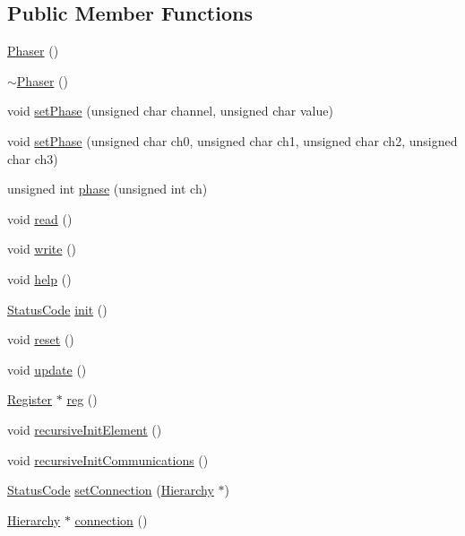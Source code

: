 \subsection*{Public Member Functions}
\begin{DoxyCompactItemize}
\item 
\hyperlink{classPhaser_a849a7f7cd7d1491c490e4ba8e9906af0}{Phaser} ()
\item 
\hyperlink{classPhaser_a1facd3a2776130beb38792025fd8be20}{$\sim$Phaser} ()
\item 
void \hyperlink{classPhaser_a35c0add55885b3c0a7551ff48e322632}{setPhase} (unsigned char channel, unsigned char value)
\item 
void \hyperlink{classPhaser_a658be408ea31d55067e283723fa144f1}{setPhase} (unsigned char ch0, unsigned char ch1, unsigned char ch2, unsigned char ch3)
\item 
unsigned int \hyperlink{classPhaser_a3928ba4f1421c83b2f7783da87727ff2}{phase} (unsigned int ch)
\item 
void \hyperlink{classPhaser_a6ce0713403e961495192ffa0590c29e4}{read} ()
\item 
void \hyperlink{classPhaser_a7a94d4129a5f743c482fa97f3c5df68f}{write} ()
\item 
void \hyperlink{classPhaser_a0f122559297d076500420a7ceb21d70d}{help} ()
\item 
\hyperlink{classStatusCode}{StatusCode} \hyperlink{classPhaser_a4691b8963a099f8a75475eb9be47a309}{init} ()
\item 
void \hyperlink{classPhaser_a0d15908b0d50f60f4ce6c6d013f75611}{reset} ()
\item 
void \hyperlink{classPhaser_ae1d1d3be2eed3973d269eab78834c594}{update} ()
\item 
\hyperlink{classRegister}{Register} $\ast$ \hyperlink{classPhaser_a3a4b64dc36e5f74292d9bec55da077a7}{reg} ()
\item 
void \hyperlink{classElement_a3c0abcb36f8906688bb7e32608df7086}{recursiveInitElement} ()
\item 
void \hyperlink{classElement_a82119ed37dff76508a2746a853ec35ba}{recursiveInitCommunications} ()
\item 
\hyperlink{classStatusCode}{StatusCode} \hyperlink{classElement_ab476b4b1df5954141ceb14f072433b89}{setConnection} (\hyperlink{classHierarchy}{Hierarchy} $\ast$)
\item 
\hyperlink{classHierarchy}{Hierarchy} $\ast$ \hyperlink{classElement_af57444353c1ddf9fa0109801e97debf7}{connection} ()
\item 

\end{DoxyCompactItemize}
